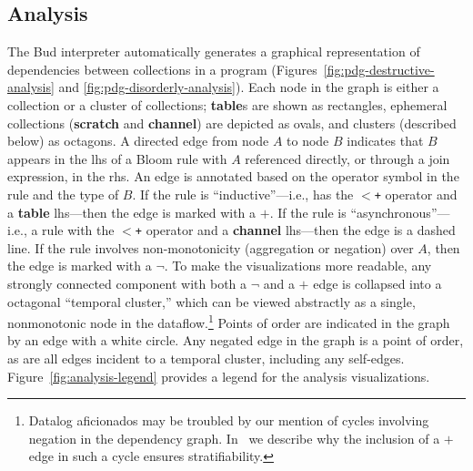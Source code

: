 \subsection{Analysis}


The Bud interpreter automatically generates a graphical
representation of dependencies between collections in a program
(Figures~\ref{fig:pdg-destructive-analysis} and \ref{fig:pdg-disorderly-analysis}).
Each node in the graph is either a collection or a cluster of collections; \textbf{table}s are shown as rectangles, ephemeral
collections (\textbf{scratch} and \textbf{channel}) are depicted as ovals, and clusters (described below) as octagons.  A
directed edge from node $A$ to node $B$ indicates that $B$ appears in the
lhs of a Bloom rule with $A$ referenced directly, or through a join expression,
in the rhs.  An edge is annotated based on the operator symbol in the rule and
the type of $B$.  If the rule is ``inductive''---i.e., has the \texttt{$<$+}
operator and a {\bf table} lhs---then the edge is marked with a $+$.  If the
rule is ``asynchronous''---i.e., a rule with the \texttt{$<$+} operator and a {\bf
channel} lhs---then the edge is a dashed line.  If the rule involves
non-monotonicity (aggregation or negation) over $A$, then the edge is marked with a $\lnot$.
To make the visualizations more readable, any strongly connected component with both a $\lnot$ and a $+$ edge is collapsed into a octagonal ``temporal cluster,'' 
which can be viewed abstractly as a single, nonmonotonic node in the 
dataflow.\footnote{Datalog aficionados may be troubled by our mention of cycles
involving negation in the dependency graph.  In~\cite{dedalus} we
describe why the inclusion of a $+$ edge in such a cycle ensures stratifiability.}
Points of order are indicated in the graph by an edge with a white circle.
 Any negated edge in the graph is a point of order, as are all edges incident to a temporal cluster, including any self-edges.  Figure~\ref{fig:analysis-legend} provides a legend for the analysis visualizations.

